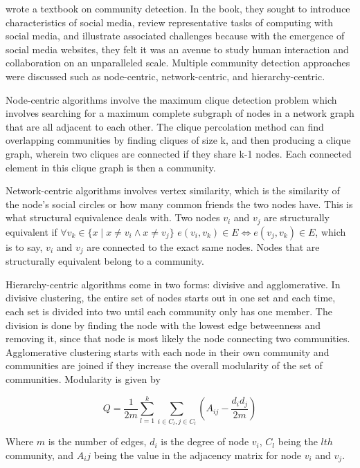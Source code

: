  wrote a textbook on community detection. In the book, they sought to introduce characteristics of social media, review representative tasks of computing with social media, and illustrate associated challenges because with the emergence of social media websites, they felt it was an avenue to study human interaction and collaboration on an unparalleled scale. Multiple community detection approaches were discussed such as node-centric, network-centric, and hierarchy-centric. 

Node-centric algorithms involve the maximum clique detection problem which involves searching for a maximum complete subgraph of nodes in a network graph that are all adjacent to each other. The clique percolation method can find overlapping communities by finding cliques of size k, and then producing a clique graph, wherein two cliques are connected if they share k-1 nodes. Each connected element in this clique graph is then a community.

Network-centric algorithms involves vertex similarity, which is the similarity of the node’s social circles or how many common friends the two nodes have. This is what structural equivalence deals with. Two nodes $v_i$ and $v_j$ are structurally equivalent if $\forall v_k \in \{x \mid x \neq v_i \wedge x \neq v_j \}$ $e(v_i,v_k) \in E \iff e(v_j,v_k) \in E$, which is to say, $v_i$ and $v_j$ are connected to the exact same nodes. Nodes that are structurally equivalent belong to a community. 

Hierarchy-centric algorithms come in two forms: divisive and agglomerative. In divisive clustering, the entire set of nodes starts out in one set and each time, each set is divided into two until each community only has one member. The division is done by finding the node with the lowest edge betweenness and removing it, since that node is most likely the node connecting two communities. Agglomerative clustering starts with each node in their own community and communities are joined if they increase the overall modularity of the set of communities. Modularity is given by

\begin{equation}
Q = \frac{1}{2m} \sum_{l = 1}^{k} \sum_{i \in C_l, j \in C_l} (A_{ij} - \frac{d_i d_j}{2m})
\end{equation}

Where $m$ is the number of edges, $d_i$ is the degree of node $v_i$, $C_l$ being the $lth$ community, and $A_ij$ being the value in the adjacency matrix for node $v_i$ and $v_j$.

